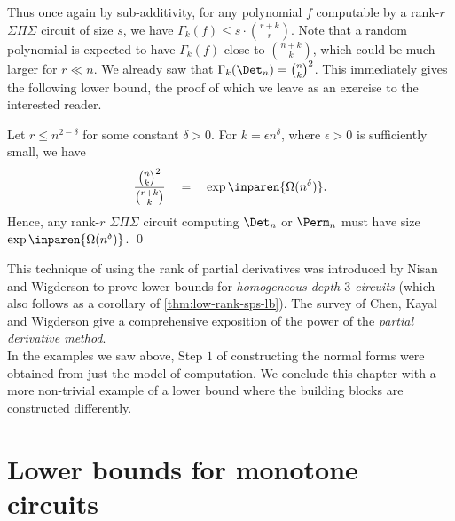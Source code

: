 Thus once again by sub-additivity, for any polynomial $f$ computable by a rank-$r$ $\Sigma\Pi\Sigma$ circuit of size $s$, we have $\Gamma_k(f) \leq s\cdot \binom{r+k}{r}$. 
Note that a random polynomial is expected to have $\Gamma_k(f)$ close to $\binom{n+k}{k}$, which could be much larger for $r\ll n$. 
We already saw that $\Gamma_k(\Det_n) = \binom{n}{k}^2$. 
This immediately gives the following lower bound, the proof of which we leave as an exercise to the interested reader. 

\begin{theorem}\label{thm:low-rank-sps-lb}
Let $r \leq n^{2-\delta}$ for some constant $\delta > 0$. 
For $k = \epsilon n^{\delta}$, where $\epsilon > 0$ is sufficiently small, we have
$$
\frac{\binom{n}{k}^2}{\binom{r+k}{k}} \quad=\quad \exp\inparen{\Omega(n^{\delta})}.
$$
Hence, any rank-$r$ $\Sigma\Pi\Sigma$ circuit computing $\Det_n$ or $\Perm_n$ must have size $\exp\inparen{\Omega(n^\delta)}$. \qed
\end{theorem}


This technique of using the rank of partial derivatives was introduced by Nisan and Wigderson \cite{nw1997} to prove lower bounds for \emph{homogeneous depth-$3$ circuits} (which also follows as a corollary of \autoref{thm:low-rank-sps-lb}). 
The survey of Chen, Kayal and Wigderson \cite{ckw11} give a comprehensive exposition of the power of the \emph{partial derivative method}. \\

In the examples we saw above, Step $1$ of constructing the normal forms were obtained from just the model of computation. 
We conclude this chapter with a more non-trivial example of a lower bound where the building blocks are constructed differently. 

\section{Lower bounds for monotone circuits}

